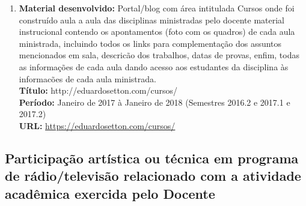 \documentclass[a4paper,oneside,10pt]{article}
\begin{document}
\begin{enumerate}
\renewcommand{\labelenumi}{{\large\bfseries\arabic{enumi}.}}

 \item   \textbf{Material desenvolvido: }  Portal/blog com área intitulada Cursos onde foi construído aula a aula das disciplinas ministradas pelo docente material instrucional contendo os apontamentos (foto com os quadros) de cada aula ministrada, incluindo todos os links para complementação dos assuntos mencionados em sala, descricão dos trabalhos, datas de provas, enfim, todas as informações de cada aula dando acesso aos estudantes da disciplina às
informacões de cada aula ministrada.  \mbox{} \\
        \textbf{Título:} http://eduardosetton.com/cursos/\\
        \textbf{Período:}  Janeiro de 2017 à Janeiro de 2018 (Semestres 2016.2 e 2017.1 e 2017.2)\\
        \textbf{URL:} \url{https://eduardosetton.com/cursos/}\\
   
        
  \end{enumerate} 
 
 \newpage 
\subsection{Participação artística ou técnica em programa de rádio/televisão relacionado com a atividade acadêmica exercida pelo Docente}
\vspace{0.3cm}
\end{document}
